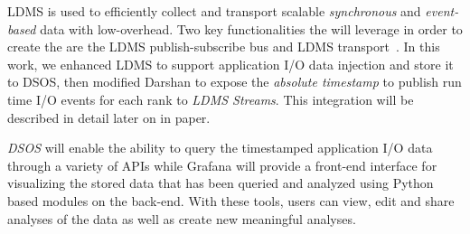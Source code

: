 
LDMS is used to efficiently collect and transport scalable \emph{synchronous} and \emph{event-based} data with low-overhead. Two key functionalities the \Darshan{} will leverage in order to create the \connector{} are the LDMS publish-subscribe bus and LDMS transport~\cite{ldmsgithub}. In this work, we enhanced LDMS to support application I/O data injection and store it to DSOS, then modified Darshan to expose the \emph{absolute timestamp} to publish run time I/O events for each rank to \emph{LDMS Streams}. This integration will be described in detail later on in paper.   





\emph{DSOS} will enable the ability to query the timestamped application I/O data through a variety of APIs while Grafana will provide a front-end interface for visualizing the stored data that has been queried and analyzed using Python based modules on the back-end. With these tools, users can view, edit and share analyses of the data as well as create new meaningful analyses. 

